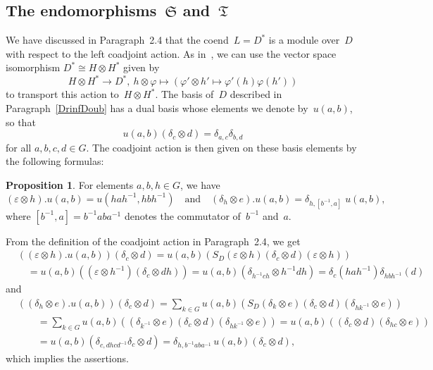 \documentclass[12pt]{article}
\makeatletter
\theoremstyle{definition}
\newtheorem{Proposition}[Satz]{Proposition}
\theoremstyle{break}
\renewenvironment{proof}[1][\proofname]{\par
\vspace{-5pt}%
\pushQED{\qed}%
\normalfont
\topsep0pt \partopsep0pt %
\trivlist
\item[\hskip\labelsep
\bfseries
#1\@addpunct{.}]\ignorespaces
}{%
\popQED\endtrivlist\@endpefalse
\addvspace{6pt plus 6pt} %
}
\newcommand{\fS}{\mathfrak{S}}
\newcommand{\fT}{\mathfrak{T}}
\renewcommand{\1}{\mathbbm{1}}
\newcommand{\ot}{\mathbin{\otimes}}
\newcommand{\uu}{u}
\makeatother
\begin{document}
\subsection{The endomorphisms~$\fS$ and~$\fT$} \label{EndomCoend}
We have discussed in Paragraph~2.4 that the coend~$L = D^*$ is a module over~$D$ with respect to the left coadjoint action. As in~\cite[Par.~3.3, p.~27]{SZ}, we can use the vector space isomorphism
$D^* \cong H \ot H^*$ given by
\[H \ot H^* \rightarrow D^*,~h \ot \varphi \mapsto 
(\varphi' \ot h' \mapsto \varphi'(h) \varphi(h'))\]
to transport this action to~$H \ot H^*$. The basis of~$D$ described in Paragraph~\ref{DrinfDoub} has a dual basis whose elements we denote by~$\uu(a,b)$, so that
\[\uu(a,b)(\delta_c \ot d) = \delta_{a,c} \delta_{b,d}\]
for all $a,b,c,d \in G$. The coadjoint action is then given on these basis elements by the following formulas:
\begin{Proposition} \label{ActCoend} 
For elements $a,b,h \in G$, we have
\[(\varepsilon \ot h).\uu(a,b) = \uu(hah^{-1}, hbh^{-1}) \quad \text{and} \quad
(\delta_h \ot e).\uu(a,b) = \delta_{h,[b^{-1}, a]} \; \uu(a,b),\]
where $[b^{-1}, a] = b^{-1} a b a^{-1}$ denotes the commutator of~$b^{-1}$ and~$a$.
\end{Proposition}
\begin{proof}
From the definition of the coadjoint action in Paragraph~2.4, we get
\begin{align*}
&((\varepsilon \ot h).\uu(a,b))(\delta_c \ot d) =
\uu(a,b)(S_D(\varepsilon \ot h)(\delta_c \ot d)(\varepsilon \ot h)) \\
& \quad = \uu(a,b)((\varepsilon \ot h^{-1})(\delta_c \ot d h))
= \uu(a,b)(\delta_{h^{-1}ch} \ot h^{-1} d h)
= \delta_c(hah^{-1})\delta_{hbh^{-1}}(d)
\end{align*}
and 
\begin{align*}
&((\delta_h \ot e).\uu(a,b))(\delta_c \ot d) =
\sum_{k \in G} \uu(a,b) (S_D(\delta_{k} \ot e)(\delta_c \ot d)(\delta_{hk^{-1}} \ot e)) \\
&\qquad = \sum_{k \in G} \uu(a,b)
((\delta_{k^{-1}} \ot e)(\delta_c \ot d)(\delta_{hk^{-1}} \ot e)) 
= \uu(a,b) ((\delta_c \ot d)(\delta_{hc} \ot e)) \\
&\qquad = \uu(a,b) (\delta_{c,dhcd^{-1}} \delta_c \ot d)
= \delta_{h,b^{-1}aba^{-1}} \, \uu(a,b)(\delta_c \ot d),
\end{align*}
which implies the assertions.
\end{proof}
\end{document}

